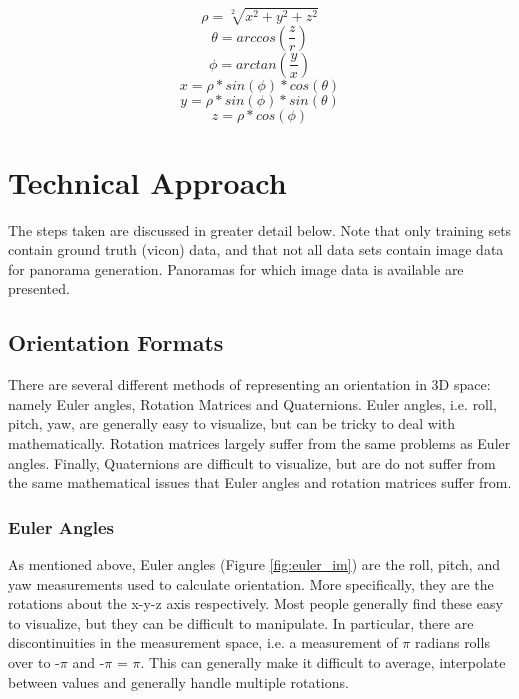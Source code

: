 \documentclass[a4paper]{article}
\begin{document}
\begin{equation*}
\rho = \sqrt[2]{x^2 + y^2 + z^2}
\end{equation*}
\begin{equation*}
\theta = arccos(\frac{z}{r})
\end{equation*}
\begin{equation*}
\phi = arctan(\frac{y}{x})
\end{equation*}
\begin{equation*}
x = \rho * sin(\phi) * cos(\theta)
\end{equation*}
\begin{equation*}
y = \rho * sin(\phi) * sin(\theta)
\end{equation*}
\begin{equation*}
z = \rho * cos(\phi)
\end{equation*}

\section{Technical Approach}

	The steps taken are discussed in greater detail below. Note that only training sets contain ground truth (vicon) data, and that not all data sets contain image data for panorama generation. Panoramas for which image data is available are presented.

\subsection{Orientation Formats}

	There are several different methods of representing an orientation in 3D space: namely Euler angles, Rotation Matrices and Quaternions. Euler angles, i.e. roll, pitch, yaw, are generally easy to visualize, but can be tricky to deal with mathematically. Rotation matrices largely suffer from the same problems as Euler angles. Finally, Quaternions are difficult to visualize, but are do not suffer from the same mathematical issues that Euler angles and rotation matrices suffer from.

\subsubsection{Euler Angles}

As mentioned above, Euler angles (Figure \ref{fig:euler_im}) are the roll, pitch, and yaw measurements used to calculate orientation. More specifically, they are the rotations about the x-y-z axis respectively. Most people generally find these easy to visualize, but they can be difficult to manipulate. In particular, there are discontinuities in the measurement space, i.e. a measurement of $\pi$ radians rolls over to -$\pi$ and -$\pi$ = $\pi$. This can generally make it difficult to average, interpolate between values and generally handle multiple rotations.
\end{document}
